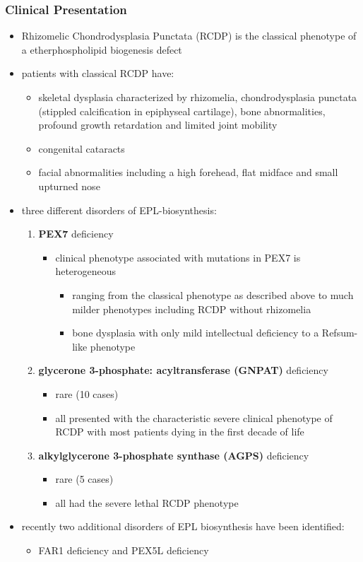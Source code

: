 \documentclass[12pt]{scrartcl}
\begin{document}
\subsubsection{Clinical Presentation}
\label{sec:org1422206}
\begin{itemize}
\item Rhizomelic Chondrodysplasia Punctata (RCDP) is the classical
phenotype of a etherphospholipid biogenesis defect
\item patients with classical RCDP have:
\begin{itemize}
\item skeletal dysplasia characterized by rhizomelia, chondrodysplasia
punctata (stippled calcification in epiphyseal cartilage), bone
abnormalities, profound growth retardation and limited joint
mobility
\item congenital cataracts
\item facial abnormalities including a high forehead, flat midface and small upturned nose
\end{itemize}
\item three different disorders of EPL-biosynthesis:
\begin{enumerate}
\item \textbf{PEX7} deficiency
\begin{itemize}
\item clinical phenotype associated with mutations in PEX7 is heterogeneous
\begin{itemize}
\item ranging from the classical phenotype as described above to much
milder phenotypes including RCDP without rhizomelia
\item bone dysplasia with only mild intellectual deficiency to a Refsum-like phenotype
\end{itemize}
\end{itemize}
\item \textbf{glycerone 3-phosphate: acyltransferase (GNPAT)} deficiency
\begin{itemize}
\item rare (10 cases)
\item all presented with the characteristic severe clinical phenotype
of RCDP with most patients dying in the first decade of life
\end{itemize}
\item \textbf{alkylglycerone 3-phosphate synthase (AGPS)} deficiency
\begin{itemize}
\item rare (5 cases)
\item all had the severe lethal RCDP phenotype
\end{itemize}
\end{enumerate}
\item recently two additional disorders of EPL biosynthesis have been
identified:
\begin{itemize}
\item FAR1 deficiency and PEX5L deficiency
\end{itemize}
\end{itemize}
\end{document}
